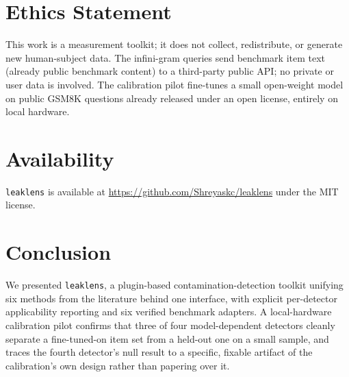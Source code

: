 \documentclass[11pt]{article}
\begin{document}
\section{Ethics Statement}

This work is a measurement toolkit; it does not collect, redistribute, or
generate new human-subject data. The infini-gram queries send benchmark
item text (already public benchmark content) to a third-party public API;
no private or user data is involved. The calibration pilot fine-tunes a
small open-weight model on public GSM8K questions already released under
an open license, entirely on local hardware.

\section{Availability}

\texttt{leaklens} is available at
\url{https://github.com/Shreyaskc/leaklens} under the MIT license.

\section{Conclusion}

We presented \texttt{leaklens}, a plugin-based contamination-detection
toolkit unifying six methods from the literature behind one interface,
with explicit per-detector applicability reporting and six verified
benchmark adapters. A local-hardware calibration pilot confirms that
three of four model-dependent detectors cleanly separate a
fine-tuned-on item set from a held-out one on a small sample, and traces
the fourth detector's null result to a specific, fixable artifact of the
calibration's own design rather than papering over it.



\end{document}
